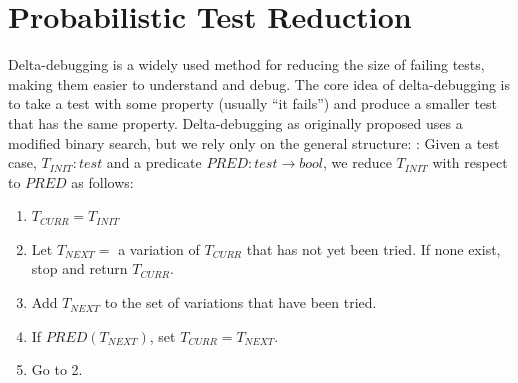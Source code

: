 \section{Probabilistic Test Reduction}

Delta-debugging \cite{DD}  is a widely used method for reducing the
size of failing tests, making them easier to understand and debug.
The core idea of delta-debugging is to take a test with some
property (usually ``it fails'')
and produce a smaller test that has the same property.
Delta-debugging as originally proposed uses a
modified binary search, but we rely only on the general structure: \cite{CReduce,onetest}:  Given a
test case, $T_{\mathit{INIT}} : \mathit{test}$ and a predicate
$\mathit{PRED}: \mathit{test} \rightarrow \mathit{bool}$, we
reduce $T_{\mathit{INIT}}$ with respect to $\mathit{PRED}$
as follows:

\begin{enumerate}
\item $T_{\mathit{CURR}} = T_{\mathit{INIT}}$
\item Let $T_{\mathit{NEXT}} =$ a variation of $T_{\mathit{CURR}}$
  that has not yet been tried.  If none exist, stop and return $T_{\mathit{CURR}}$.
\item Add $T_{\mathit{NEXT}}$ to the set of variations that have been
  tried.
\item If $\mathit{PRED}(T_{\mathit{NEXT}})$, set $T_{\mathit{CURR}} =
  T_{\mathit{NEXT}}$.
\item Go to 2.
\end{enumerate}

